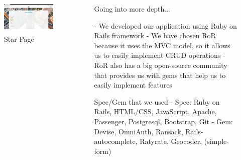 \documentclass[final]{beamer}
\newlength{\sepwid}
\newlength{\onecolwid}
\newlength{\twocolwid}
\begin{document}
\begin{frame}[t]
\begin{columns}[t]
\begin{column}{\twocolwid}
\begin{columns}[t,totalwidth=\twocolwid]
\begin{column}{\onecolwid}
\begin{figure}
\includegraphics[height=0.5\linewidth]{star.png}
\caption{Star Page}
\end{figure}


\end{column} %

\end{columns} %

\end{column} %

\begin{column}{\sepwid}\end{column} %

\begin{column}{\onecolwid} %

\begin{block}{Going into more depth...}


- We developed our application using Ruby on Rails framework \newline
- We have chosen RoR because it uses the MVC model, so it allows us to easily implement CRUD operations\newline
- RoR also has a big open-source community that provides us with gems that help us to easily implement features\newline
\end{block}
\begin{alertblock}{Spec/Gem that we used}
- Spec: Ruby on Rails, HTML/CSS, JavaScript, Apache, Passenger, Postgresql, Bootstrap, Git\newline\newline
- Gem: Devise, OmniAuth, Ransack, Rails-autocomplete, Ratyrate, Geocoder, (simple-form)



\end{alertblock}
\end{column}
\end{columns}
\end{frame}
\end{document}
